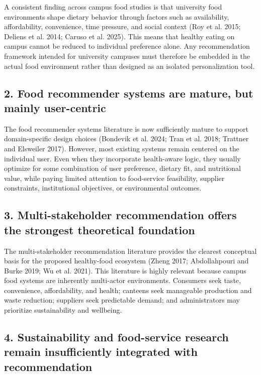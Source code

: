 \documentclass[
  letterpaper,
  DIV=11,
  numbers=noendperiod]{scrartcl}
\begin{document}
A consistent finding across campus food studies is that university food
environments shape dietary behavior through factors such as
availability, affordability, convenience, time pressure, and social
context (Roy et al. 2015; Deliens et al. 2014; {Caruso et al.} 2025).
This means that healthy eating on campus cannot be reduced to individual
preference alone. Any recommendation framework intended for university
campuses must therefore be embedded in the actual food environment
rather than designed as an isolated personalization tool.

\subsection{2. Food recommender systems are mature, but mainly
user-centric}\label{food-recommender-systems-are-mature-but-mainly-user-centric}

The food recommender systems literature is now sufficiently mature to
support domain-specific design choices ({Bondevik et al.} 2024; Tran et
al. 2018; Trattner and Elsweiler 2017). However, most existing systems
remain centered on the individual user. Even when they incorporate
health-aware logic, they usually optimize for some combination of user
preference, dietary fit, and nutritional value, while paying limited
attention to food-service feasibility, supplier constraints,
institutional objectives, or environmental outcomes.

\subsection{3. Multi-stakeholder recommendation offers the strongest
theoretical
foundation}\label{multi-stakeholder-recommendation-offers-the-strongest-theoretical-foundation}

The multi-stakeholder recommendation literature provides the clearest
conceptual basis for the proposed healthy-food ecosystem (Zheng 2017;
Abdollahpouri and Burke 2019; {Wu et al.} 2021). This literature is
highly relevant because campus food systems are inherently multi-actor
environments. Consumers seek taste, convenience, affordability, and
health; canteens seek manageable production and waste reduction;
suppliers seek predictable demand; and administrators may prioritize
sustainability and wellbeing.

\subsection{4. Sustainability and food-service research remain
insufficiently integrated with
recommendation}\label{sustainability-and-food-service-research-remain-insufficiently-integrated-with-recommendation}
\end{document}
